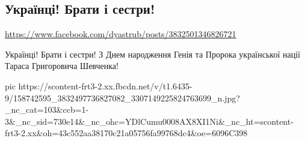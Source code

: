  
 
 
 
 

\subsection{Українці! Брати і сестри!}
\label{sec:09_03_2021.fb.jarosh_dmitrij.1.shevchenko}
\url{https://www.facebook.com/dyastrub/posts/3832501346826721}

Українці! Брати і сестри!
З Днем народження Генія та Пророка української нації Тараса Григоровича Шевченка!

\ifcmt
  pic https://scontent-frt3-2.xx.fbcdn.net/v/t1.6435-9/158742595_3832497736827082_3307149225824763699_n.jpg?_nc_cat=103&ccb=1-3&_nc_sid=730e14&_nc_ohc=YDlCumu0008AX8XI1Ni&_nc_ht=scontent-frt3-2.xx&oh=43c552aa38170c21a05756fa99768dc4&oe=6096C398
\fi

